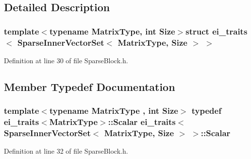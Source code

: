\subsection{Detailed Description}
\subsubsection*{template$<$typename Matrix\-Type, int Size$>$struct ei\-\_\-traits$<$ Sparse\-Inner\-Vector\-Set$<$ Matrix\-Type, Size $>$ $>$}



Definition at line 30 of file Sparse\-Block.\-h.



\subsection{Member Typedef Documentation}
\hypertarget{structei__traits_3_01_sparse_inner_vector_set_3_01_matrix_type_00_01_size_01_4_01_4_a4a2fad2e3edfc87203c9101c0d95dabd}{
\subsubsection[{Scalar}]{\setlength{\rightskip}{0pt plus 5cm}template$<$typename Matrix\-Type , int Size$>$ typedef {\bf ei\-\_\-traits}$<$Matrix\-Type$>$\-::{\bf Scalar} {\bf ei\-\_\-traits}$<$ {\bf Sparse\-Inner\-Vector\-Set}$<$ Matrix\-Type, Size $>$ $>$\-::{\bf Scalar}}}\label{structei__traits_3_01_sparse_inner_vector_set_3_01_matrix_type_00_01_size_01_4_01_4_a4a2fad2e3edfc87203c9101c0d95dabd}


Definition at line 32 of file Sparse\-Block.\-h.



